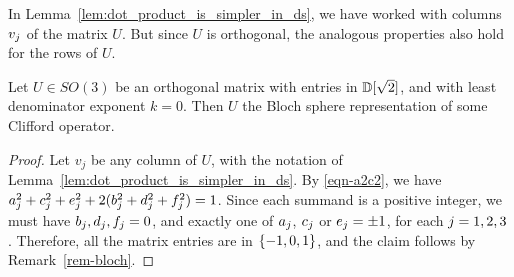 \begin{remark}
  In Lemma~\vref{lem:dot_product_is_simpler_in_ds}, we have worked with columns $v_j$ of the
  matrix $U$. But since $U$ is orthogonal, the analogous properties also hold for the rows of $U$.
\end{remark}

\begin{lemma}\label{lem:k0-clifford}
  Let $U\in SO(3)$ be an orthogonal matrix with entries in $\mathbb{D}[\sqrt{2}]$, and with least denominator
  exponent $k=0$. Then $U$ the Bloch sphere representation of some Clifford operator.
\end{lemma}

\begin{proof}
  Let $v_j$ be any column of $U$, with the notation of
  Lemma~\vref{lem:dot_product_is_simpler_in_ds}. By {\vref{eqn-a2c2}}, we have
  $a_j^2+c_j^2+e_j^2+2(b_j^2+d_j^2+f_j^2)=1$. Since each summand is a positive
  integer, we must have $b_j,d_j,f_j = 0$, and exactly one of $a_j$, $c_j$ or
  $e_j=\pm1$, for each $j=1,2,3$. Therefore, all the matrix entries are in $\{-1,0,1\}$, and
  the claim follows by Remark~\vref{rem-bloch}.
\end{proof}

